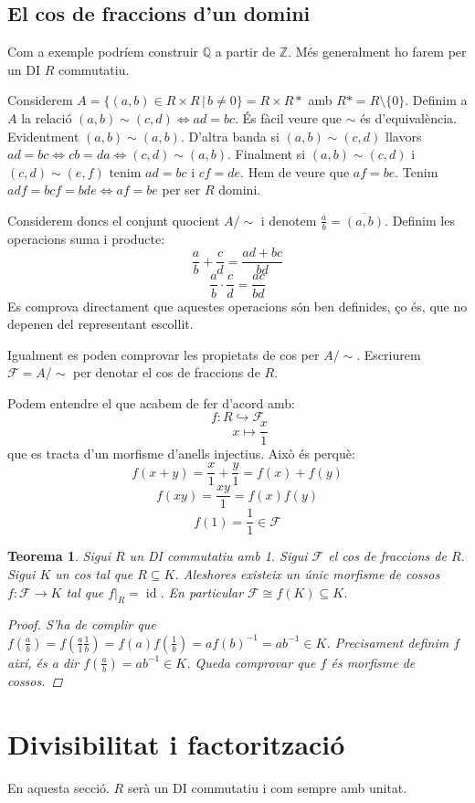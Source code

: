 \documentclass[a4paper,11pt]{report}
\newcommand{\inv}[1]{#1^{-1}}
\newcommand{\barra}{\,|\,}
\DeclareMathOperator{\id}{id}
\renewcommand{\bar}{\overline}
\renewcommand{\implies}{\Leftrightarrow}
\theoremstyle{theorem}
\newtheorem{teorema}{\normalfont \sffamily\bfseries Teorema}[section]
\theoremstyle{definition}
\begin{document}
\section{El cos de fraccions d'un domini}
Com a exemple podríem construir $\mathbb{Q}$ a partir de $\mathbb{Z}$. Més generalment ho farem per un DI $R$ commutatiu.

Considerem $A=\{(a,b)\in R\times R\barra b\neq 0\}=R\times R*$ amb $R*=R\setminus \{0\}$. Definim a $A$ la relació $(a,b)\sim (c,d)\implies ad=bc$. És fàcil veure que $\sim$ és d'equivalència. Evidentment $(a,b)\sim(a,b)$. D'altra banda si $(a,b)\sim(c,d)$ llavors $ad=bc\implies cb=da\implies (c,d)\sim(a,b)$. Finalment si $(a,b)\sim (c,d)$ i $(c,d)\sim (e,f)$ tenim $ad=bc$ i $cf=de$. Hem de veure que $af=be$. Tenim $adf=bcf=bde\implies af=be$ per ser $R$ domini.

Considerem doncs el conjunt quocient $A/\sim$ i denotem $\tfrac{a}{b}=\bar{(a,b)}$. Definim les operacions suma i producte:
$$\frac{a}{b}+\frac{c}{d}=\frac{ad+bc}{bd}$$
$$\frac{a}{b}\cdot\frac{c}{d}=\frac{ac}{bd}$$
Es comprova directament que aquestes operacions són ben definides, ço és, que no depenen del representant escollit.

Igualment es poden comprovar les propietats de cos per $A/\sim$. Escriurem $\mathcal{F}=A/\sim$ per denotar el cos de fraccions de $R$.

Podem entendre el que acabem de fer d'acord amb:
$$f:R\hookrightarrow\mathcal{F}$$
$$\qquad x\mapsto \frac{x}{1}$$ 
que es tracta d'un morfisme d'anells injectius. Això és perquè: $$f(x+y)=\frac{x}{1}+\frac{y}{1}=f(x)+f(y)$$
$$f(xy)=\frac{xy}{1}=f(x)f(y)$$
$$f(1)=\frac{1}{1}\in\mathcal{F}$$

\begin{teorema}
Sigui $R$ un DI commutatiu amb 1. Sigui $\mathcal{F}$ el cos de fraccions de $R$. Sigui $K$ un cos tal que $R\subseteq K$. Aleshores existeix un únic morfisme de cossos $f:\mathcal{F}\longrightarrow K$ tal que $f|_R=\id$. En particular $\mathcal{F}\cong f(K)\subseteq K$.
\begin{proof}
	S'ha de complir que $f(\frac{a}{b})=f(\frac{a}{1}\frac{1}{b})=f(a)f(\frac{1}{b})=a\inv{f(b)}=a\inv{b}\in K$. Precisament definim $f$ així, és a dir $f(\frac{a}{b})=a\inv{b}\in K$. Queda comprovar que $f$ és morfisme de cossos.
\end{proof}
\end{teorema}
\chapter{Divisibilitat i factorització}
En aquesta secció. $R$ serà un DI commutatiu i com sempre amb unitat.
\end{document}
